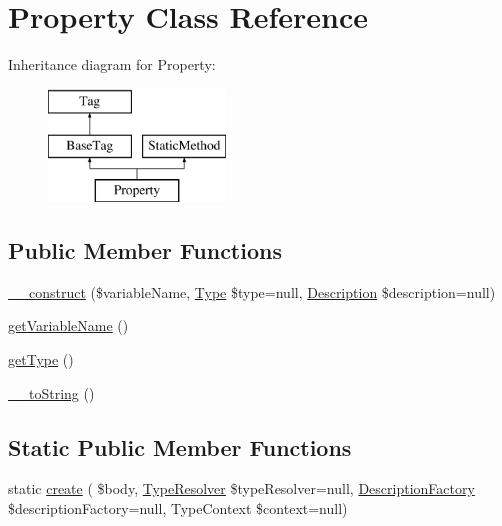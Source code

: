 \hypertarget{classphp_documentor_1_1_reflection_1_1_doc_block_1_1_tags_1_1_property}{}\section{Property Class Reference}
\label{classphp_documentor_1_1_reflection_1_1_doc_block_1_1_tags_1_1_property}
Inheritance diagram for Property\+:\begin{figure}[H]
\begin{center}
\leavevmode
\includegraphics[height=3.000000cm]{classphp_documentor_1_1_reflection_1_1_doc_block_1_1_tags_1_1_property}
\end{center}
\end{figure}
\subsection*{Public Member Functions}
\begin{DoxyCompactItemize}
\item 
\mbox{\hyperlink{classphp_documentor_1_1_reflection_1_1_doc_block_1_1_tags_1_1_property_a1e5de5b31a43e9ffe064e27942aa5e63}{\+\_\+\+\_\+construct}} (\$variable\+Name, \mbox{\hyperlink{interfacephp_documentor_1_1_reflection_1_1_type}{Type}} \$type=null, \mbox{\hyperlink{classphp_documentor_1_1_reflection_1_1_doc_block_1_1_description}{Description}} \$description=null)
\item 
\mbox{\hyperlink{classphp_documentor_1_1_reflection_1_1_doc_block_1_1_tags_1_1_property_a20af85a4f4041ed681b095e1427b2a1d}{get\+Variable\+Name}} ()
\item 
\mbox{\hyperlink{classphp_documentor_1_1_reflection_1_1_doc_block_1_1_tags_1_1_property_a830b5c75df72b32396701bc563fbe3c7}{get\+Type}} ()
\item 
\mbox{\hyperlink{classphp_documentor_1_1_reflection_1_1_doc_block_1_1_tags_1_1_property_a7516ca30af0db3cdbf9a7739b48ce91d}{\+\_\+\+\_\+to\+String}} ()
\end{DoxyCompactItemize}
\subsection*{Static Public Member Functions}
\begin{DoxyCompactItemize}
\item 
static \mbox{\hyperlink{classphp_documentor_1_1_reflection_1_1_doc_block_1_1_tags_1_1_property_a01b1e5c3741d05766720d8cb6d900172}{create}} ( \$body, \mbox{\hyperlink{classphp_documentor_1_1_reflection_1_1_type_resolver}{Type\+Resolver}} \$type\+Resolver=null, \mbox{\hyperlink{classphp_documentor_1_1_reflection_1_1_doc_block_1_1_description_factory}{Description\+Factory}} \$description\+Factory=null, Type\+Context \$context=null)
\end{DoxyCompactItemize}
